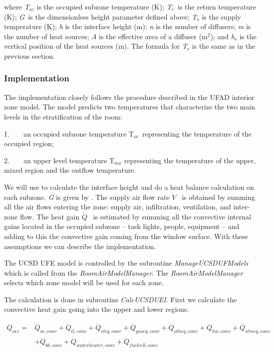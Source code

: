 where \emph{T\(_{oz}\)} is the occupied subzone temperature (K); \emph{T\(_{r}\)}~is the return temperature (K); \emph{G}~is the dimensionless height parameter defined above; \emph{T\(_{s}\)} is the supply temperature (K); \emph{h} is the interface height (m); \emph{n} is the number of diffusers; \emph{m} is the number of heat sources; \emph{A} is the effective area of a diffuser (m\(^{2}\)); and \emph{h\(_{s}\)} is the vertical position of the heat sources (m). The formula for \emph{T\(_{r}\)} is the same as in the previous section.

\subsubsection{Implementation}\label{implementation-2}

The implementation closely follows the procedure described in the UFAD interior zone model. The model predicts two temperatures that characterize the two main levels in the stratification of the room:

1.~~~~an occupied subzone temperature T\(_{oc}\)~representing the temperature of the occupied region;

2.~~~~an upper level temperature T\(_{mx}\) representing the temperature of the upper, mixed region and the outflow temperature.

We will use to calculate the interface height and do a heat balance calculation on each subzone. \emph{G} is given by . The supply air flow rate \(\dot V\) ~is obtained by summing all the air flows entering the zone: supply air, infiltration, ventilation, and inter-zone flow. The heat gain \(\dot Q\) ~is estimated by summing all the convective internal gains located in the occupied subzone -- task lights, people, equipment -- and adding to this the convective gain coming from the window surface. With these assumptions we can describe the implementation.

The UCSD UFE model is controlled by the subroutine \emph{ManageUCSDUFModels} which is called from the \emph{RoomAirModelManager}. The \emph{RoomAirModelManager} selects which zone model will be used for each zone.

The calculation is done in subroutine \emph{CalcUCSDUEI}. First we calculate the convective heat gain going into the upper and lower regions.

\begin{equation}
\begin{split}
\dot Q_{ocz} =& \dot Q_{oc,conv} + \dot Q_{tl,conv} + \dot Q_{eleq,conv} + \dot Q_{gaseq,conv} + \dot Q_{otheq,conv} + \dot Q_{hw,conv} + \dot Q_{stmeq,conv} \\
&+ \dot Q_{bb,conv} + \dot Q_{waterheater,conv} + \dot Q_{fuelcell,conv}
\end{split}
\end{equation}

